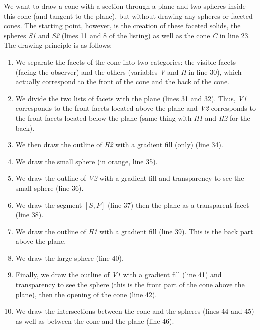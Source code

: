 We want to draw a cone with a section through a plane and two spheres inside this cone (and tangent to the plane), but without drawing any spheres or faceted cones. The starting point, however, is the creation of these faceted solids, the spheres \emph{S1} and \emph{S2} (lines 11 and 8 of the listing) as well as the cone \emph{C} in line 23. The drawing principle is as follows:
\begin{enumerate}
    \item We separate the facets of the cone into two categories: the visible facets (facing the observer) and the others (variables \emph{V} and \emph{H} in line 30), which actually correspond to the front of the cone and the back of the cone.
    \item We divide the two lists of facets with the plane (lines 31 and 32). Thus, \emph{V1} corresponds to the front facets located above the plane and \emph{V2} corresponds to the front facets located below the plane (same thing with \emph{H1} and \emph{H2} for the back).
    \item We then draw the outline of \emph{H2} with a gradient fill (only) (line 34).
    \item We draw the small sphere (in orange, line 35).
    \item We draw the outline of \emph{V2} with a gradient fill and transparency to see the small sphere (line 36).
    \item We draw the segment $[S,P]$ (line 37) then the plane as a transparent facet (line 38).
    \item We draw the outline of \emph{H1} with a gradient fill (line 39). This is the back part above the plane.
    \item We draw the large sphere (line 40).
    \item Finally, we draw the outline of \emph{V1} with a gradient fill (line 41) and transparency to see the sphere (this is the front part of the cone above the plane), then the opening of the cone (line 42).
    \item We draw the intersections between the cone and the spheres (lines 44 and 45) as well as between the cone and the plane (line 46).
\end{enumerate}

